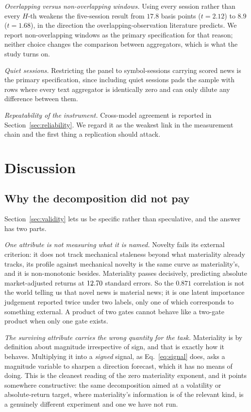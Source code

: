 \documentclass[preprint,12pt,authoryear]{elsarticle}
\theoremstyle{plain}
\theoremstyle{remark}
\begin{document}
\emph{Overlapping versus non-overlapping windows.} Using every session rather
than every $H$-th weakens the five-session result from $17.8$ basis points
($t=2.12$) to $8.9$ ($t=1.68$), in the direction the overlapping-observation
literature predicts. We report non-overlapping windows as the primary
specification for that reason; neither choice changes the comparison between
aggregators, which is what the study turns on.

\emph{Quiet sessions.} Restricting the panel to symbol-sessions carrying scored
news is the primary specification, since including quiet sessions pads the sample
with rows where every text aggregator is identically zero and can only dilute any
difference between them.

\emph{Repeatability of the instrument.} Cross-model agreement is reported in
Section~\ref{sec:reliability}. We regard it as the weakest link in the
measurement chain and the first thing a replication should attack.

\section{Discussion}\label{sec:discussion}

\subsection{Why the decomposition did not pay}

Section~\ref{sec:validity} lets us be specific rather than speculative, and the
answer has two parts.

\emph{One attribute is not measuring what it is named.} Novelty fails its
external criterion: it does not track mechanical staleness beyond what
materiality already tracks, its profile against mechanical novelty is the same
curve as materiality's, and it is non-monotonic besides. Materiality passes
decisively, predicting absolute market-adjusted returns at $12.70$ standard
errors. So the $0.871$ correlation is not the world telling us that novel news is
material news; it is one latent importance judgement reported twice under two
labels, only one of which corresponds to something external. A product of two
gates cannot behave like a two-gate product when only one gate exists.

\emph{The surviving attribute carries the wrong quantity for the task.}
Materiality is by definition about magnitude irrespective of sign, and that is
exactly how it behaves. Multiplying it into a \emph{signed} signal, as
Eq.~\eqref{eq:signal} does, asks a magnitude variable to sharpen a direction
forecast, which it has no means of doing. This is the cleanest reading of the
zero materiality exponent, and it points somewhere constructive: the same
decomposition aimed at a volatility or absolute-return target, where
materiality's information is of the relevant kind, is a genuinely different
experiment and one we have not run.
\end{document}
